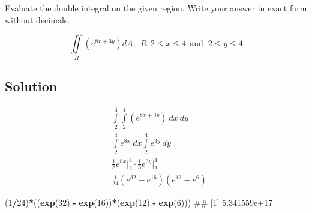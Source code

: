 \documentclass[]{article}
\newenvironment{Shaded}{\begin{snugshade}}{\end{snugshade}}
\newcommand{\DecValTok}[1]{\textcolor[rgb]{0.00,0.00,0.81}{#1}}
\newcommand{\KeywordTok}[1]{\textcolor[rgb]{0.13,0.29,0.53}{\textbf{#1}}}
\newcommand{\NormalTok}[1]{#1}
\newcommand{\OperatorTok}[1]{\textcolor[rgb]{0.81,0.36,0.00}{\textbf{#1}}}
\newcommand{\StringTok}[1]{\textcolor[rgb]{0.31,0.60,0.02}{#1}}
\begin{document}
Evaluate the double integral on the given region. Write your answer in
exact form without decimals.

\[
\iint \limits_R (e^{8x + 3y})dA; \ \ R: 2 \leq x \leq 4 \ \ \text{and } \ 2 \leq y \leq 4
\]

\hypertarget{solution-4}{%
\subsection{Solution}\label{solution-4}}

\begin{align*}
&\int\limits_{2}^{4} \int\limits_{2}^{4} (e^{8x + 3y}) \ dx \ dy \\
&\int\limits_{2}^{4} e^{8x} \ dx \int\limits_{2}^{4} e^{3y} \ dy \\
&\frac{1}{8}e^{8x}\Big|_{2}^{4} \cdot \frac{1}{3}e^{3y}\Big|_{2}^{4} \\
&\frac{1}{24}(e^{32} - e^{16})(e^{12} - e^{6})
\end{align*}

\begin{Shaded}
\begin{Highlighting}[]
\NormalTok{(}\DecValTok{1}\OperatorTok{/}\DecValTok{24}\NormalTok{)}\OperatorTok{*}\NormalTok{((}\KeywordTok{exp}\NormalTok{(}\DecValTok{32}\NormalTok{) }\OperatorTok{-}\StringTok{ }\KeywordTok{exp}\NormalTok{(}\DecValTok{16}\NormalTok{))}\OperatorTok{*}\NormalTok{(}\KeywordTok{exp}\NormalTok{(}\DecValTok{12}\NormalTok{) }\OperatorTok{-}\StringTok{ }\KeywordTok{exp}\NormalTok{(}\DecValTok{6}\NormalTok{)))}
\NormalTok{## [1] 5.341559e+17}
\end{Highlighting}
\end{Shaded}
\end{document}
